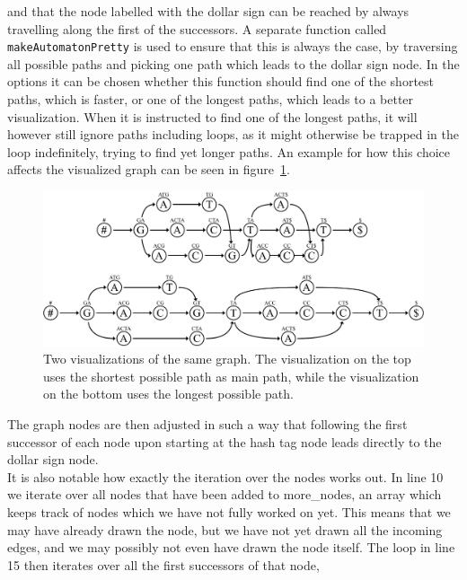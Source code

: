 \documentclass[a4paper,12pt,twoside,BCOR=10mm]{scrbook}
\begin{document}
and that the node labelled with the dollar sign can be reached by always travelling
along the first of the successors.
A separate function called \texttt{makeAutomatonPretty} is used to ensure that this is always the case,
by traversing all possible paths and picking one path which leads to the dollar sign node.
In the options it can be chosen whether this function
should find one of the shortest paths, which is faster, or one of the longest paths,
which leads to a better visualization.
When it is instructed to find one of the longest paths, it will however still ignore
paths including loops, as it might otherwise be trapped in the loop indefinitely,
trying to find yet longer paths.
An example for how this choice affects
the visualized graph can be seen in figure~\ref{fig:evo_fig_visualize_short_vs_long}.
\begin{figure}[!htb]
\centering
\includegraphics[width=\textwidth]{evo_fig_visualize_short_vs_long.pdf}
\caption[Visualizations of graph with shortest and longest main paths]{Two visualizations of the same graph. The visualization on the top uses the shortest possible path as main path, while the visualization on the bottom uses the longest possible path.} \label{fig:evo_fig_visualize_short_vs_long}
\end{figure}
The graph nodes are then adjusted in such a way that following the first successor of each
node upon starting at the hash tag node leads directly to the dollar sign node. \\
It is also notable how exactly the iteration over the nodes works out.
In line 10 we iterate over all nodes that have been added to more\_nodes,
an array which keeps track of nodes which we have not fully worked on yet.
This means that we may have already drawn the node, but we have not yet
drawn all the incoming edges, and we may possibly not even have drawn the node itself.
The loop in line 15 then iterates over all the first successors of that node,
\end{document}

